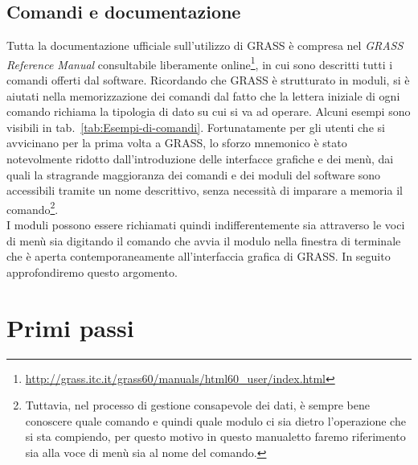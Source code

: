 	\subsection{Comandi e documentazione}
		Tutta la documentazione ufficiale sull'utilizzo di GRASS è compresa nel \emph{GRASS Reference Manual} consultabile liberamente online\footnote{\href{http://grass.itc.it/grass60/manuals/html60_user/index.html}{http://grass.itc.it/grass60/manuals/html60\_{}user/index.html}}, in cui sono descritti tutti i comandi offerti dal software. Ricordando che GRASS è strutturato in moduli, si è aiutati nella memorizzazione dei comandi dal fatto che la lettera iniziale di ogni comando richiama la tipologia di dato su cui si va ad operare. Alcuni esempi sono visibili in tab.~\ref{tab:Esempi-di-comandi}. Fortunatamente per gli utenti che si avvicinano per la prima volta a GRASS, lo sforzo mnemonico è stato notevolmente ridotto dall'introduzione delle interfacce grafiche e dei menù, dai quali la stragrande maggioranza dei comandi e dei moduli del software sono accessibili tramite un nome descrittivo, senza necessità di imparare a memoria il comando\footnote{Tuttavia, nel processo di gestione consapevole dei dati, è sempre bene conoscere quale comando e quindi quale modulo ci sia dietro l'operazione che si sta compiendo, per questo motivo in questo manualetto faremo riferimento sia alla voce di menù sia al nome del comando.}.\\

		I moduli possono essere richiamati quindi indifferentemente sia attraverso le voci di menù sia digitando il comando che avvia il modulo nella finestra di terminale che è aperta contemporaneamente all'interfaccia grafica di GRASS. In seguito approfondiremo questo argomento.

		

\section{Primi passi}

